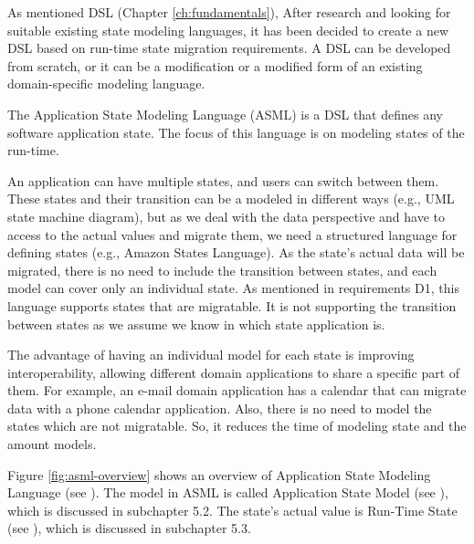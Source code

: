 As mentioned DSL (Chapter \ref{ch:fundamentals}), After research and looking for suitable existing state modeling languages, it has been decided to create a new DSL based on run-time state migration requirements.
A DSL can be developed from scratch, or it can be a modification or a modified form of an existing domain-specific modeling language.

The Application State Modeling Language (ASML) is a DSL that defines any software application state.
The focus of this language is on modeling states of the run-time.

An application can have multiple states, and users can switch between them.
These states and their transition can be a modeled in different ways (e.g., UML state machine diagram), but as we deal with the data perspective and have to access to the actual values and migrate them, we need a structured language for defining states (e.g., Amazon States Language). As the state’s actual data will be migrated, there is no need to include the transition between states, and each model can cover only an individual state. As mentioned in requirements D1, this language supports states that are migratable.
It is not supporting the transition between states as we assume we know in which state application is. 

The advantage of having an individual model for each state is improving interoperability, allowing different domain applications to share a specific part of them.
For example, an e-mail domain application has a calendar that can migrate data with a phone calendar application.
Also, there is no need to model the states which are not migratable. So, it reduces the time of modeling state and the amount models. 

Figure \ref{fig:asml-overview} shows an overview of Application State Modeling Language (see \fcircone). The model in ASML is called Application State Model (see \fcirctwo), which is discussed in subchapter 5.2. The state’s actual value is Run-Time State (see \fcircthree), which is discussed in subchapter 5.3.

